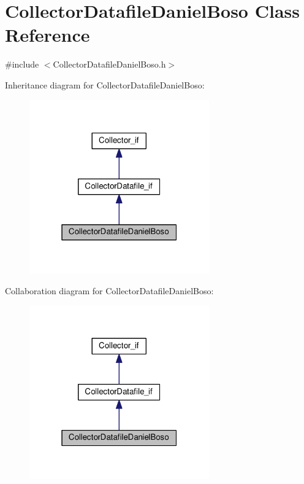 \hypertarget{class_collector_datafile_daniel_boso}{\section{Collector\-Datafile\-Daniel\-Boso Class Reference}
\label{class_collector_datafile_daniel_boso}
}


{\ttfamily \#include $<$Collector\-Datafile\-Daniel\-Boso.\-h$>$}



Inheritance diagram for Collector\-Datafile\-Daniel\-Boso\-:
\nopagebreak
\begin{figure}[H]
\begin{center}
\leavevmode
\includegraphics[width=220pt]{class_collector_datafile_daniel_boso__inherit__graph}
\end{center}
\end{figure}


Collaboration diagram for Collector\-Datafile\-Daniel\-Boso\-:
\nopagebreak
\begin{figure}[H]
\begin{center}
\leavevmode
\includegraphics[width=220pt]{class_collector_datafile_daniel_boso__coll__graph}
\end{center}
\end{figure}
